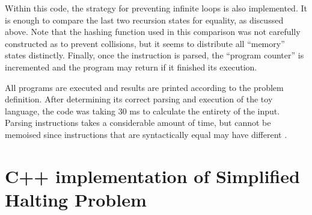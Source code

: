 \documentclass[12pt]{article}
\begin{document}
Within this code, the strategy for preventing infinite loops is also implemented. It is enough to compare the last two recursion states for equality, as discussed above. Note that the hashing function used in this comparison was not carefully constructed as to prevent collisions, but it seems to distribute all ``memory'' states distinctly. Finally, once the instruction is parsed, the ``program counter'' is incremented and the program may return if it finished its execution.

All programs are executed and results are printed according to the problem definition. After determining its correct parsing and execution of the toy language, the code was taking $30$ ms to calculate the entirety of the input. Parsing instructions takes a considerable amount of time, but cannot be memoised since instructions that are syntactically equal may have different .






\appendix

\section{C++ implementation of Simplified Halting Problem}\label{app:impl}

\end{document}
